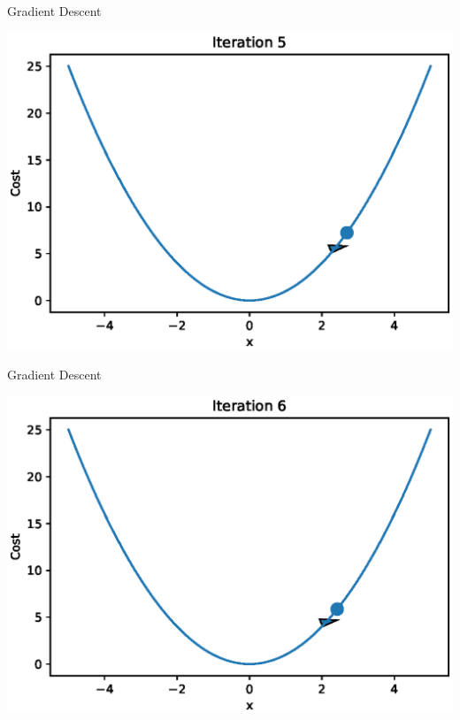 \documentclass{beamer}
\begin{document}
\begin{frame}{Gradient Descent}
  \begin{center}
       \includegraphics[totalheight=6cm]{gradient-descent/iteration-5.eps}
   \end{center}
\end{frame}

\begin{frame}{Gradient Descent}
  \begin{center}
       \includegraphics[totalheight=6cm]{gradient-descent/iteration-6.eps}
   \end{center}
\end{frame}
\end{document}
